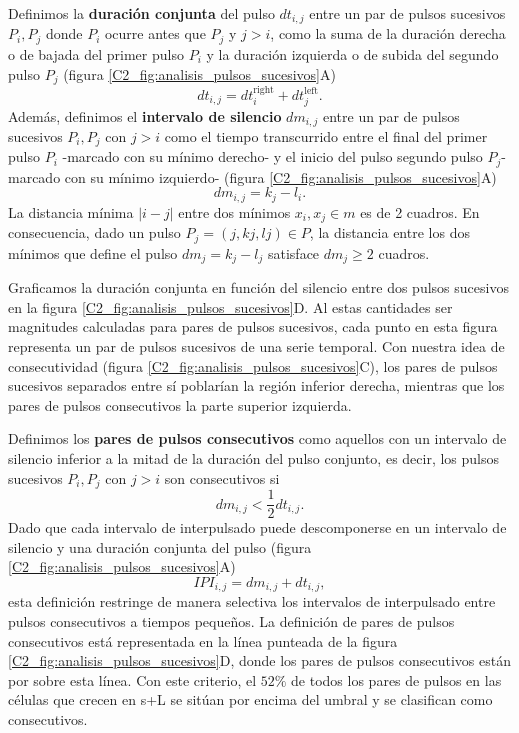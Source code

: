 \documentclass[./main.tex]{subfiles}
\begin{document}
Definimos la \textbf{duración conjunta} del pulso $dt_{i,j}$ entre un par de pulsos sucesivos $P_i, P_j$ donde $P_i$ ocurre antes que $P_j$ y $j >i$, como la suma de la duración derecha o de bajada del primer pulso $P_i$ y la duración izquierda o de subida del segundo pulso $P_j$ (figura \ref{C2_fig:analisis_pulsos_sucesivos}A) 
\begin{equation}
    dt_{i,j} = dt_i^{\text{right}} + dt_j^{\text{left}}.
\end{equation}
Además, definimos el \textbf{intervalo de silencio} $dm_{i,j}$ entre un par de pulsos sucesivos $P_i, P_j$ con $j >i$ como el tiempo transcurrido entre el final del primer pulso $P_i$ -marcado con su mínimo derecho- y el inicio del pulso segundo pulso $P_j$-marcado con su mínimo izquierdo- (figura \ref{C2_fig:analisis_pulsos_sucesivos}A) 
\begin{equation}
    dm_{i,j} = k_j - l_i.
\end{equation}
La distancia mínima $|i-j|$ entre dos mínimos $x_i, x_j \in m$ es de 2 cuadros. En consecuencia, dado un pulso $P_j=(j, kj, lj) \in P$, la distancia entre los dos mínimos que define el pulso $dm_j= k_j-l_j$ satisface $dm_j \geq 2$ cuadros. 


Graficamos la duración conjunta en función del silencio entre dos pulsos sucesivos en la figura \ref{C2_fig:analisis_pulsos_sucesivos}D. Al estas cantidades ser magnitudes calculadas para pares de pulsos sucesivos, cada punto en esta figura representa un par de pulsos sucesivos de una serie temporal. Con nuestra idea de consecutividad (figura \ref{C2_fig:analisis_pulsos_sucesivos}C), los pares de pulsos sucesivos separados entre sí poblarían la región inferior derecha, mientras que los pares de pulsos consecutivos la parte superior izquierda. 


Definimos los \textbf{pares de pulsos consecutivos} como aquellos con un intervalo de silencio inferior a la mitad de la duración del pulso conjunto, es decir, los pulsos sucesivos $P_i, P_j$ con $j >i$ son consecutivos si
\begin{equation}
    dm_{i,j} < \frac{1}{2} dt_{i,j}.
\end{equation} 
Dado que cada intervalo de interpulsado puede descomponerse en un intervalo de silencio y una duración conjunta del pulso (figura \ref{C2_fig:analisis_pulsos_sucesivos}A)
\begin{equation}
    IPI_{i,j} = dm_{i,j} + dt_{i,j},
\end{equation}
esta definición restringe de manera selectiva los intervalos de interpulsado entre pulsos consecutivos a tiempos pequeños. La definición de pares de pulsos consecutivos está representada en la línea punteada de la figura \ref{C2_fig:analisis_pulsos_sucesivos}D, donde los pares de pulsos consecutivos están por sobre esta línea. Con este criterio, el $52\%$ de todos los pares de pulsos en las células que crecen en s+L se sitúan por encima del umbral y se clasifican como consecutivos. 
\end{document}
